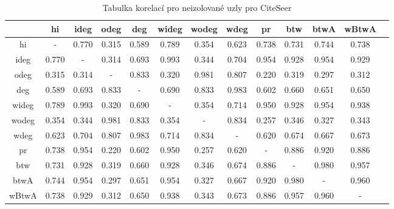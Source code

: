 \documentclass{bakalarka}
\begin{document}
\begin{table}[!ht]
\centering
\caption{Tabulka korelací pro neizolované uzly pro CiteSeer}
\label{tab:corr3}
\begin{sideways}
\begin{tabular}{c|cccccccccccc}
\toprule
&hi  &ideg &odeg &deg  &wideg&wodeg&wdeg &pr   &btw  &btwA &wBtwA\\
\midrule
hi   &  -  &0.770&0.315&0.589&0.789&0.354&0.623&0.738&0.731&0.744&0.738\\
ideg &0.770&  -  &0.314&0.693&0.993&0.344&0.704&0.954&0.928&0.954&0.929\\
odeg &0.315&0.314&  -  &0.833&0.320&0.981&0.807&0.220&0.319&0.297&0.312\\
deg  &0.589&0.693&0.833&  -  &0.690&0.833&0.983&0.602&0.660&0.651&0.650\\
wideg&0.789&0.993&0.320&0.690&  -  &0.354&0.714&0.950&0.928&0.954&0.938\\
wodeg&0.354&0.344&0.981&0.833&0.354&  -  &0.834&0.257&0.346&0.327&0.343\\
wdeg &0.623&0.704&0.807&0.983&0.714&0.834&  -  &0.620&0.674&0.667&0.673\\
pr   &0.738&0.954&0.220&0.602&0.950&0.257&0.620&  -  &0.886&0.920&0.886\\
btw  &0.731&0.928&0.319&0.660&0.928&0.346&0.674&0.886&  -  &0.980&0.957\\
btwA &0.744&0.954&0.297&0.651&0.954&0.327&0.667&0.920&0.980&  -  &0.960\\
wBtwA&0.738&0.929&0.312&0.650&0.938&0.343&0.673&0.886&0.957&0.960&  -  \\
\bottomrule
\end{tabular}
\end{sideways}
\end{table}
\end{document}
